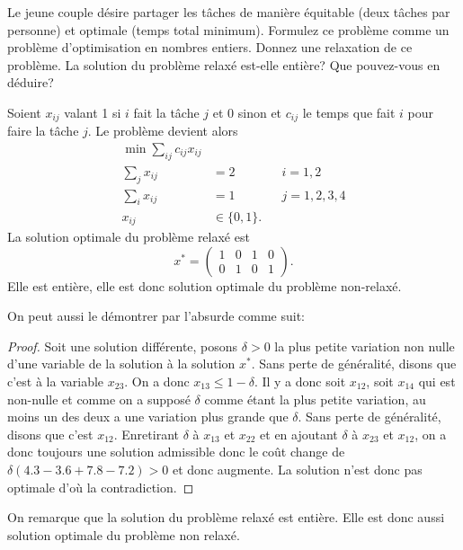 \begin{enumerate}
    Le jeune couple  désire partager les tâches de manière équitable (deux tâches par personne) et optimale (temps total minimum). Formulez
    ce problème comme un problème d'optimisation en nombres entiers. Donnez une relaxation de ce problème. La solution du problème
    relaxé est-elle entière? Que pouvez-vous en déduire?


    \begin{solution}
      Soient $x_{ij}$ valant 1 si $i$ fait la tâche $j$ et 0 sinon
      et $c_{ij}$ le temps que fait $i$ pour faire la tâche $j$.
      Le problème devient alors
      \begin{align*}
        \min \sum_{ij}c_{ij}x_{ij}\\
        \sum_{j} x_{ij} & = 2 && i = 1,2\\
        \sum_{i} x_{ij} & = 1 && j = 1,2,3,4\\
        x_{ij} & \in \lbrace 0,1\rbrace.
      \end{align*}
      La solution optimale du problème relaxé est
      \[ x^* =
        \begin{pmatrix}
          1 & 0 & 1 & 0\\
          0 & 1 & 0 & 1
      \end{pmatrix}. \]
      Elle est entière, elle est donc solution optimale du problème non-relaxé.

      On peut aussi le démontrer par l'absurde comme suit:
      \begin{proof}
        Soit une solution différente,
        posons $\delta > 0$ la plus petite variation non
        nulle d'une variable de la solution à la solution $x^*$.
        Sans perte de généralité, disons que c'est à la variable $x_{23}$.
        On a donc $x_{13} \leq 1 - \delta$. Il y a donc soit $x_{12}$,
        soit $x_{14}$ qui est non-nulle et comme on a supposé $\delta$ comme
        étant la plus petite variation,
        au moins un des deux a une variation plus grande que $\delta$.
        Sans perte de généralité, disons que c'est $x_{12}$.
        Enretirant $\delta$ à $x_{13}$ et $x_{22}$
        et en ajoutant $\delta$ à $x_{23}$ et $x_{12}$,
        on a donc toujours une solution admissible donc le coût
        change de $\delta(4.3-3.6 +7.8-7.2) > 0$ et donc augmente.
        La solution n'est donc pas optimale d'où la contradiction.
      \end{proof}
      On remarque que la solution du problème relaxé est entière.
      Elle est donc aussi solution optimale du problème non relaxé.
    \end{solution}


\end{enumerate}
